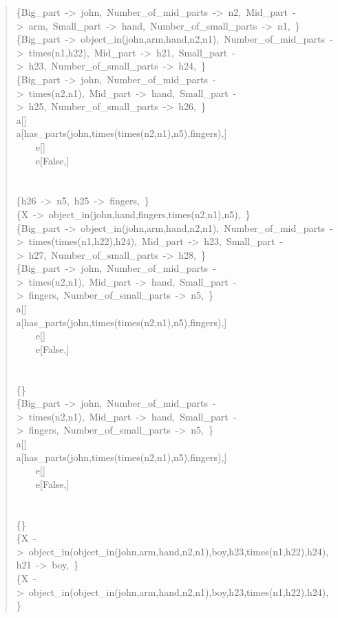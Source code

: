 \begin{quote}
\{Big\_part~->~john,~Number\_of\_mid\_parts~->~n2,~Mid\_part~->~arm,~Small\_part~->~hand,~Number\_of\_small\_parts~->~n1,~\}\\
\{Big\_part~->~object\_in(john,arm,hand,n2,n1),~Number\_of\_mid\_parts~->~times(n1,h22),~Mid\_part~->~h21,~Small\_part~->~h23,~Number\_of\_small\_parts~->~h24,~\}\\
\{Big\_part~->~john,~Number\_of\_mid\_parts~->~times(n2,n1),~Mid\_part~->~hand,~Small\_part~->~h25,~Number\_of\_small\_parts~->~h26,~\}\\
a[]\\
a[has\_parts(john,times(times(n2,n1),n5),fingers),]\\
~~~~e[]\\
~~~~e[False,]\\
~\\
~\\
\{h26~->~n5,~h25~->~fingers,~\}\\
\{X~->~object\_in(john,hand,fingers,times(n2,n1),n5),~\}\\
\{Big\_part~->~object\_in(john,arm,hand,n2,n1),~Number\_of\_mid\_parts~->~times(times(n1,h22),h24),~Mid\_part~->~h23,~Small\_part~->~h27,~Number\_of\_small\_parts~->~h28,~\}\\
\{Big\_part~->~john,~Number\_of\_mid\_parts~->~times(n2,n1),~Mid\_part~->~hand,~Small\_part~->~fingers,~Number\_of\_small\_parts~->~n5,~\}\\
a[]\\
a[has\_parts(john,times(times(n2,n1),n5),fingers),]\\
~~~~e[]\\
~~~~e[False,]\\
~\\
~\\
\{\}\\
\{Big\_part~->~john,~Number\_of\_mid\_parts~->~times(n2,n1),~Mid\_part~->~hand,~Small\_part~->~fingers,~Number\_of\_small\_parts~->~n5,~\}\\
a[]\\
a[has\_parts(john,times(times(n2,n1),n5),fingers),]\\
~~~~e[]\\
~~~~e[False,]\\
~\\
~\\
\{\}\\
\{X~->~object\_in(object\_in(john,arm,hand,n2,n1),boy,h23,times(n1,h22),h24),~h21~->~boy,~\}\\
\{X~->~object\_in(object\_in(john,arm,hand,n2,n1),boy,h23,times(n1,h22),h24),~\}\\

\end{quote}
